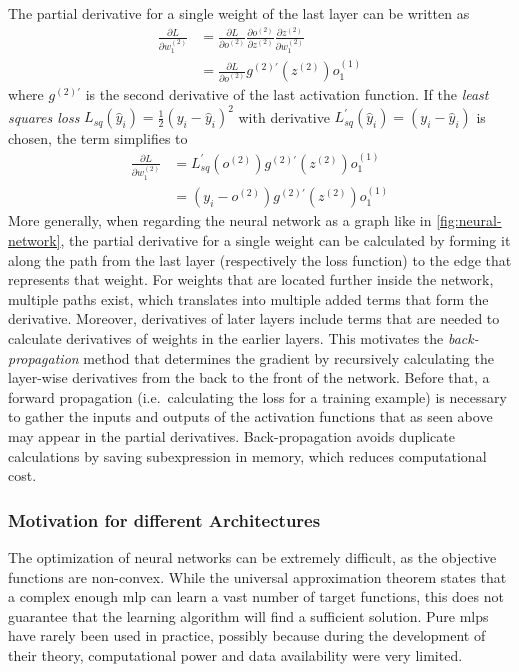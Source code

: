 The partial derivative for a single weight of the last layer can be written as
\begin{align*}
    \frac{\partial L}{\partial w_1^{(2)}} &= \frac{\partial L}{\partial o^{(2)}} \frac{\partial o^{(2)}}{\partial z^{(2)}}  \frac{\partial z^{(2)}}{\partial w_1^{(2)}} \\
    &= \frac{\partial L}{\partial o^{(2)}} g^{(2)\prime} (z^{(2)}) o_1^{(1)}
\end{align*}
where $g^{(2)\prime}$ is the second derivative of the last activation function.
If the \textit{least squares loss} $L_{sq} (\hat{y}_i)= \frac{1}{2}(y_i - \hat{y}_i)^2$ with derivative $L_{sq}^{\prime} (\hat{y}_i) = (y_i - \hat{y}_i)$ is chosen, the term simplifies to
\begin{align*}
    \frac{\partial L}{\partial w_1^{(2)}} &= L_{sq}^{\prime} (o^{(2)}) g^{(2)\prime} (z^{(2)}) o_1^{(1)} \\
    &= (y_i - o^{(2)}) g^{(2)\prime} (z^{(2)}) o_1^{(1)}
\end{align*}
More generally, when regarding the neural network as a graph like in \autoref{fig:neural-network}, the partial derivative for a single weight can be calculated by forming it along the path from the last layer (respectively the loss function) to the edge that represents that weight.
For weights that are located further inside the network, multiple paths exist, which translates into multiple added terms that form the derivative.
Moreover, derivatives of later layers include terms that are needed to calculate derivatives of weights in the earlier layers.
This motivates the \textit{back-propagation} method that determines the gradient by recursively calculating the layer-wise derivatives from the back to the front of the network.
Before that, a forward propagation (i.e.\ calculating the loss for a training example) is necessary to gather the inputs and outputs of the activation functions that as seen above may appear in the partial derivatives.
Back-propagation avoids duplicate calculations by saving subexpression in memory, which reduces computational cost.

\subsubsection{Motivation for different Architectures}
The optimization of neural networks can be extremely difficult, as the objective functions are non-convex.
While the universal approximation theorem states that a complex enough \gls{mlp} can learn a vast number of target functions, this does not guarantee that the learning algorithm will find a sufficient solution.
Pure \glspl{mlp} have rarely been used in practice, possibly because during the development of their theory, computational power and data availability were very limited.

